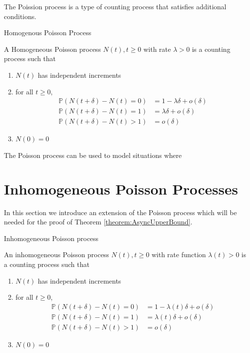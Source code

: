The Poission process is a type of counting process that satisfies additional conditions. 

\begin{definition}
	Homogenous Poisson Process

	\noindent
	A Homogeneous Poisson process ${N(t), t \geq 0}$ with rate $\lambda > 0$ is a counting process such that
	\begin{enumerate}
		\item $N(t)$ has independent increments
		\item for all $t \geq 0$, 
		\begin{align*}
			\mathbb{P}(N(t + \delta) - N(t) = 0) &= 1 - \lambda\delta + o(\delta) \\
			\mathbb{P}(N(t + \delta) - N(t) = 1) &= \lambda\delta + o(\delta) \\
			\mathbb{P}(N(t + \delta) - N(t) > 1) &= o(\delta)
		\end{align*}
		\item $N(0) = 0$
	\end{enumerate}
\end{definition}

The Poisson process can be used to model situations where %


\section{Inhomogeneous Poisson Processes}\label{section:inhomoPP}

In this section we introduce an extension of the Poisson process which will be needed for the proof of Theorem \ref{theorem:AsyncUpperBound}.

\begin{definition}
	Inhomogeneous Poisson process

	\noindent
	An inhomogeneous Poisson process ${N(t), t \geq 0}$ with rate function $\lambda(t) > 0$ is a counting process such that
	\begin{enumerate}
		\item $N(t)$ has independent increments
		\item for all $t \geq 0$, 
		\begin{align*}
			\mathbb{P}(N(t + \delta) - N(t) = 0) &= 1 - \lambda(t)\delta + o(\delta) \\
			\mathbb{P}(N(t + \delta) - N(t) = 1) &= \lambda(t)\delta + o(\delta) \\
			\mathbb{P}(N(t + \delta) - N(t) > 1) &= o(\delta)
		\end{align*}
		\item $N(0) = 0$
	\end{enumerate}
\end{definition}

